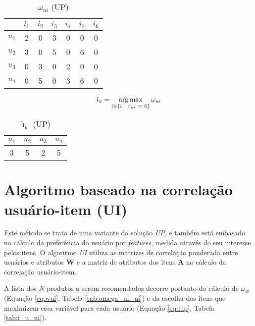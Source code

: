 \begin{table}[p]
\begin{center}
    \caption{$\omega_{ui}$ (UP)}
    \label{tab:omega_ui}
    \begin{tabular}{ | c | c | c | c | c | c | c | } 
    \hline
     & $i_1$ & $i_2$ & $i_3$ & $i_4$ & $i_5$ & $i_6$ \\ \hline
     $u_1$ & 2 & 0 & 3 & 0 & 0 & 0 \\ \hline
     $u_2$ & 3 & 0 & 5 & 0 & 6 & 0 \\ \hline
     $u_3$ & 0 & 3 & 0 & 2 & 0 & 0 \\ \hline
     $u_4$ & 0 & 5 & 0 & 3 & 6 & 0 \\ \hline
    \end{tabular}
\end{center}
\end{table}

\begin{equation}
\label{eq:iup} 
    \hat{\imath}_u = \operatorname*{arg\,max}_{i \in \left\{i~|~r_{ui}~=~0\right\}}{\omega_{ui}}
\end{equation} 

\begin{table}[p]
\begin{center}
    \caption{$\hat{\imath}_u$ (UP)}
    \label{tab:i_u}
    \begin{tabular}{ | c | c | c | c | } 
    \hline
     $u_1$ & $u_2$ & $u_3$ & $u_4$   \\ \hline
     3 & 5 & 2 & 5  \\ \hline
    \end{tabular}
\end{center}
\end{table}

\section{Algoritmo baseado na correlação usuário-item (UI)} %
\label{sec:algoritmo_baseado_na_correla_o_usu_rio_item_ui_}

Este método se trata de uma variante da solução \textit{UP}, e também está embasado no cálculo da preferência do usuário por \textit{features}, medida através do seu interesse pelos itens. O algoritmo \textit{UI} utiliza as matrizes de correlação ponderada entre usuários e atributos $\mathbf{W}$ e a matriz de atributos dos itens $\mathbf{A}$ no cálculo da correlação usuário-item.

A lista dos $N$ produtos a serem recomendados decorre portanto do cálculo de $\omega_{ui}$ (Equação \ref{eq:wui}, Tabela \ref{tab:omega_ui_ui}) e da escolha dos itens que maximizem essa variável para cada usuário (Equação \ref{eq:iup}, Tabela \ref{tab:i_u_ui}).

